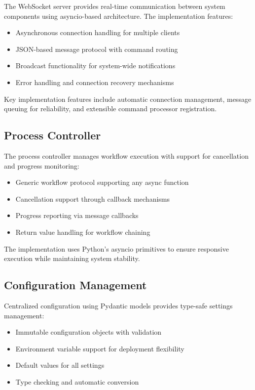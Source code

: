 The WebSocket server provides real-time communication between system components using asyncio-based architecture. The implementation features:

\begin{itemize}
    \item Asynchronous connection handling for multiple clients
    \item JSON-based message protocol with command routing
    \item Broadcast functionality for system-wide notifications
    \item Error handling and connection recovery mechanisms
\end{itemize}

Key implementation features include automatic connection management, message queuing for reliability, and extensible command processor registration.

\subsection{Process Controller}

The process controller manages workflow execution with support for cancellation and progress monitoring:

\begin{itemize}
    \item Generic workflow protocol supporting any async function
    \item Cancellation support through callback mechanisms
    \item Progress reporting via message callbacks
    \item Return value handling for workflow chaining
\end{itemize}

The implementation uses Python's asyncio primitives to ensure responsive execution while maintaining system stability.

\subsection{Configuration Management}

Centralized configuration using Pydantic models provides type-safe settings management:

\begin{itemize}
    \item Immutable configuration objects with validation
    \item Environment variable support for deployment flexibility
    \item Default values for all settings
    \item Type checking and automatic conversion
\end{itemize}


